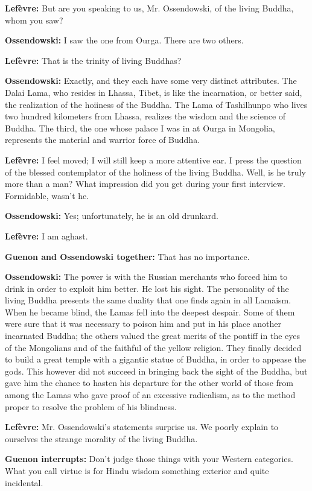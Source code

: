 \textbf{Lefèvre:} But are you speaking to us, Mr. Ossendowski, of the living Buddha, whom you saw?

\textbf{Ossendowski:} I saw the one from Ourga. There are two others.

\textbf{Lefèvre:} That is the trinity of living Buddhas?

\textbf{Ossendowski:} Exactly, and they each have some very distinct attributes. The Dalai Lama, who resides in Lhassa, Tibet, is like the incarnation, or better said, the realization of the hoiiness of the Buddha. The Lama of Tashilhunpo who lives two hundred kilometers from Lhassa, realizes the wisdom and the science of Buddha. The third, the one whose palace I was in at Ourga in Mongolia, represents the material and warrior force of Buddha.

\textbf{Lefèvre:} I feel moved; I will still keep a more attentive ear. I press the question of the blessed contemplator of the holiness of the living Buddha. Well, is he truly more than a man? What impression did you get during your first interview. Formidable, wasn't he.

\textbf{Ossendowski:} Yes; unfortunately, he is an old drunkard.

\textbf{Lefèvre:} I am aghast.

\textbf{Guenon and Ossendowski together:} That has no importance.

\textbf{Ossendowski:} The power is with the Russian merchants who forced him to drink in order to exploit him better. He lost his sight. The personality of the living Buddha presents the same duality that one finds again in all Lamaism. When he became blind, the Lamas fell into the deepest despair. Some of them were sure that it was necessary to poison him and put in his place another incarnated Buddha; the others valued the great merits of the pontiff in the eyes of the Mongolians and of the faithful of the yellow religion. They finally decided to build a great temple with a gigantic statue of Buddha, in order to appease the gods. This however did not succeed in bringing back the sight of the Buddha, but gave him the chance to hasten his departure for the other world of those from among the Lamas who gave proof of an excessive radicalism, as to the method proper to resolve the problem of his blindness.

\textbf{Lefèvre:} Mr. Ossendowski's statements surprise us. We poorly explain to ourselves the strange morality of the living Buddha.

\textbf{Guenon interrupts:} Don't judge those things with your Western categories. What you call virtue is for Hindu wisdom something exterior and quite incidental.

